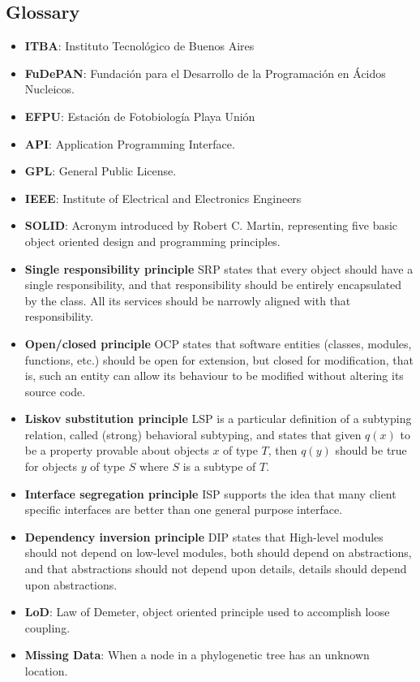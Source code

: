 \documentclass[10pt,a4paper]{article}
\begin{document}
\begin{appendices} 
    
	\section{Glossary}
  \label{appendix-def}
  \begin{itemize}
    \item \textbf{ITBA}: Instituto Tecnol\'ogico de Buenos Aires
    \item \textbf{FuDePAN}: Fundaci\'on para el Desarrollo de la Programaci\'on en \'Acidos Nucleicos.
	\item \textbf{EFPU}: Estaci\'on de Fotobiolog\'ia Playa Uni\'on
    \item \textbf{API}: Application Programming Interface.
    \item \textbf{GPL}: General Public License.
    \item \textbf{IEEE}: Institute of Electrical and Electronics Engineers
    \item \textbf{SOLID}: Acronym introduced by Robert C. Martin, representing five basic object oriented design and programming principles.
	      \item \textbf{Single responsibility principle }
	  SRP states that every object should have a single responsibility, and that responsibility should be entirely encapsulated by the class. All its services should be narrowly aligned with that responsibility.
      \item \textbf{Open/closed principle }
	  OCP states that software entities (classes, modules, functions, etc.) should be open for extension, but closed for modification, that is, such an entity can allow its behaviour to be modified without altering its source code.
      \item \textbf{Liskov substitution principle }
	  LSP is a particular definition of a subtyping relation, called (strong) behavioral subtyping, and states that given $q(x)$ to be a property provable about objects $x$ of type $T$, then $q(y)$ should be true for objects $y$ of type $S$ where $S$ is a subtype of $T$.
      \item \textbf{Interface segregation principle }
	  ISP supports the idea that many client specific interfaces are better than one general purpose interface.
      \item \textbf{Dependency inversion principle }  
	  DIP states that High-level modules should not depend on low-level modules, both should depend on abstractions, and that abstractions should not depend upon details, details should depend upon abstractions.
    \item \textbf{LoD}: Law of Demeter, object oriented principle used to accomplish loose coupling.
	\item \textbf{Missing Data}: When a node in a phylogenetic tree has an unknown location.
    \end{itemize}
	

\end{appendices}
\end{document}
